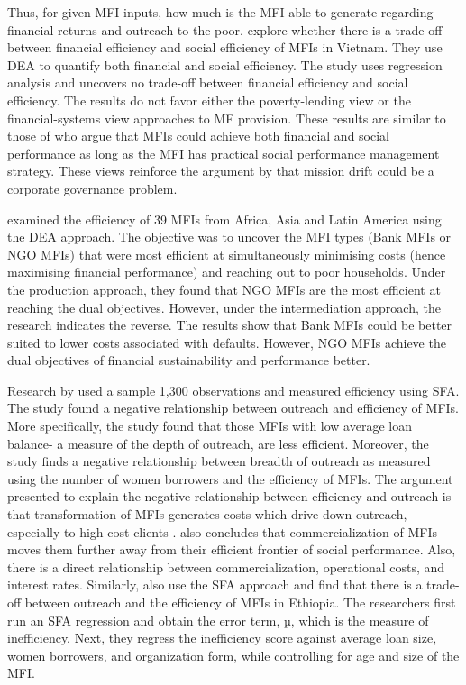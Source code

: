 \documentclass[a4paper, nobind]{templates/ociamthesis}
\begin{document}
Thus, for given MFI inputs, how much is the MFI able to generate regarding financial returns and outreach to the poor. \textcite{lebovics2016financial} explore whether there is a trade-off between financial efficiency and social efficiency of MFIs in Vietnam. They use DEA to quantify both financial and social efficiency. The study uses regression analysis and uncovers no trade-off between financial efficiency and social efficiency. The results do not favor either the poverty-lending view or the financial-systems view approaches to MF provision. These results are similar to those of \textcite{bedecarrats2012combining} who argue that MFIs could achieve both financial and social performance as long as the MFI has practical social performance management strategy. These views reinforce the argument by \textcite{abeysekera2014sustainability} that mission drift could be a corporate governance problem.

\textcite{haq2010efficiency} examined the efficiency of 39 MFIs from Africa, Asia and Latin America using the DEA approach. The objective was to uncover the MFI types (Bank MFIs or NGO MFIs) that were most efficient at simultaneously minimising costs (hence maximising financial performance) and reaching out to poor households. Under the production approach, they found that NGO MFIs are the most efficient at reaching the dual objectives. However, under the intermediation approach, the research indicates the reverse. The results show that Bank MFIs could be better suited to lower costs associated with defaults. However, NGO MFIs achieve the dual objectives of financial sustainability and performance better.

Research by \textcite{hermes2011outreach} used a sample 1,300 observations and measured efficiency using SFA. The study found a negative relationship between outreach and efficiency of MFIs. More specifically, the study found that those MFIs with low average loan balance- a measure of the depth of outreach, are less efficient. Moreover, the study finds a negative relationship between breadth of outreach as measured using the number of women borrowers and the efficiency of MFIs. The argument presented to explain the negative relationship between efficiency and outreach is that transformation of MFIs generates costs which drive down outreach, especially to high-cost clients \autocite{cull2011does}. \textcite{roberts2013endogeneity} also concludes that commercialization of MFIs moves them further away from their efficient frontier of social performance. Also, there is a direct relationship between commercialization, operational costs, and interest rates.
Similarly, \textcite{abate2014cost} also use the SFA approach and find that there is a trade-off between outreach and the efficiency of MFIs in Ethiopia. The researchers first run an SFA regression and obtain the error term, µ, which is the measure of inefficiency. Next, they regress the inefficiency score against average loan size, women borrowers, and organization form, while controlling for age and size of the MFI.
\end{document}
